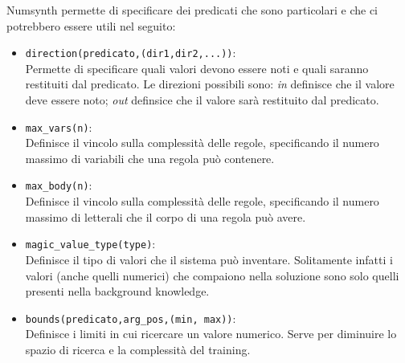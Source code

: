 \myskip

Numsynth permette di specificare dei predicati che sono particolari e che ci potrebbero essere utili nel seguito:
\begin{itemize}
    \item \texttt{direction(predicato,(dir1,dir2,...))}: \\
        Permette di specificare quali valori devono essere noti e quali saranno restituiti dal predicato. Le direzioni possibili sono: \textit{in} definisce che il valore deve essere noto; \textit{out} definsice che il valore sarà restituito dal predicato.
    \item \texttt{max\_vars(n)}: \\
        Definisce il vincolo sulla complessità delle regole, specificando il numero massimo di variabili che una regola può contenere.
    \item \texttt{max\_body(n)}: \\
        Definisce il vincolo sulla complessità delle regole, specificando il numero massimo di letterali che il corpo di una regola può avere.
    \item \texttt{magic\_value\_type(type)}: \\
        Definisce il tipo di valori che il sistema può inventare. Solitamente infatti i valori (anche quelli numerici) che compaiono nella soluzione sono solo quelli presenti nella background knowledge.
    \item \texttt{bounds(predicato,arg\_pos,(min, max))}: \\
        Definisce i limiti in cui ricercare un valore numerico. Serve per diminuire lo spazio di ricerca e la complessità del training.
\end{itemize}